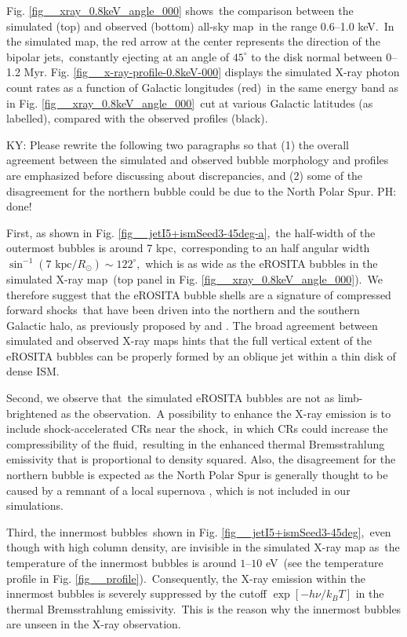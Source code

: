 \documentclass[fleqn,usenatbib,useAMS]{mnras}
\begin{document}
  Fig. \ref{fig__xray_0.8keV_angle_000} shows\
  the comparison between the simulated (top) and observed (bottom) all-sky map\
  in the range 0.6--1.0 keV.\
  In the simulated map, the red arrow at the center represents the direction of the bipolar jets,\
  constantly ejecting at an angle of $45^{\circ}$ to the disk normal between 0--1.2 Myr. Fig. \ref{fig__x-ray-profile-0.8keV-000} displays the simulated X-ray photon count rates as a function of Galactic longitudes (red)\
  in the same energy band as in Fig. \ref{fig__xray_0.8keV_angle_000}\
  cut at various Galactic latitudes (as labelled), compared with the observed profiles (black).

  {\color{red} KY: Please rewrite the following two paragraphs so that (1) the overall agreement between the simulated and observed bubble morphology and profiles are emphasized before discussing about discrepancies, and (2) some of the disagreement for the northern bubble could be due to the North Polar Spur. PH: done!}

  First, as shown in Fig. \ref{fig__jetI5+ismSeed3-45deg-a},\
  the half-width of the outermost bubbles is around 7 kpc,\
  corresponding to an half angular width $\sin^{-1}(7 \text{ kpc}/R_{\odot})\sim122^{\circ}$,\
  which is as wide as the eROSITA bubbles in the simulated X-ray map\
  (top panel in Fig. \ref{fig__xray_0.8keV_angle_000}).\
  We therefore suggest that the eROSITA bubble shells are a signature of compressed forward shocks\
  that have been driven into the northern and the southern Galactic halo,
  as previously proposed by \citet{Predehl2020} and \citet{Yang2022}. The broad agreement between simulated and observed X-ray maps hints that the full vertical extent of the eROSITA bubbles can be properly formed by an oblique jet within a thin disk of dense ISM.

  Second, we observe that\
  the simulated eROSITA bubbles are not as limb-brightened as the observation.\
  A possibility to enhance the X-ray emission is to include shock-accelerated CRs near the shock,\
  in which CRs could increase the compressibility of the fluid,\
  resulting in the enhanced thermal Bremsstrahlung emissivity that is proportional to density squared. Also, the disagreement for the northern bubble is expected as the North Polar Spur is generally thought to be caused by a remnant of a local supernova \citep{Egger1995}, which is not included in our simulations.


  Third, the innermost bubbles\
  shown in Fig. \ref{fig__jetI5+ismSeed3-45deg},\
  even though with high column density, are invisible in the simulated X-ray map as\
  the temperature of the innermost bubbles is around $1$--$10$ eV\
  (see the temperature profile in Fig. \ref{fig__profile}).\
  Consequently, the X-ray emission within the innermost bubbles
  is severely suppressed by the cutoff $\exp\left[-h\nu/k_{B}T\right]$ in the thermal Bremsstrahlung emissivity.\
  This is the reason why the innermost bubbles are unseen in the X-ray observation.
\end{document}
